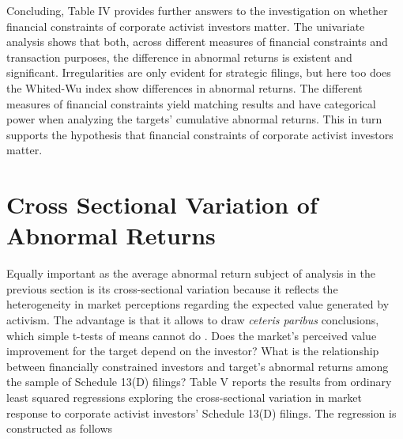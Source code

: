 \documentclass[12pt]{article}
\begin{document}
Concluding, Table IV provides further answers to the investigation on whether financial constraints of corporate activist investors matter. The univariate analysis shows that both, across different measures of financial constraints and transaction purposes, the difference in abnormal returns is existent and significant. Irregularities are only evident for strategic filings, but here too does the Whited-Wu index show differences in abnormal returns. The different measures of financial constraints yield matching results and have categorical power when analyzing the targets' cumulative abnormal returns. This in turn supports the hypothesis that financial constraints of corporate activist investors matter. 

\section{Cross Sectional Variation of Abnormal Returns}

Equally important as the average abnormal return subject of analysis in the previous section is its cross-sectional variation because it reflects the heterogeneity in market perceptions regarding the expected value generated by activism. The advantage is that it allows to draw \emph{ceteris paribus} conclusions, which simple t-tests of means cannot do \citep[p.111]{Khatami2014}. Does the market's perceived value improvement for the target depend on the investor? What is the relationship between financially constrained investors and target's abnormal returns among the sample of Schedule 13(D) filings?
Table V reports the results from ordinary least squared regressions exploring the cross-sectional variation in market response to corporate activist investors' Schedule 13(D) filings. The regression is constructed as follows 
\end{document}
